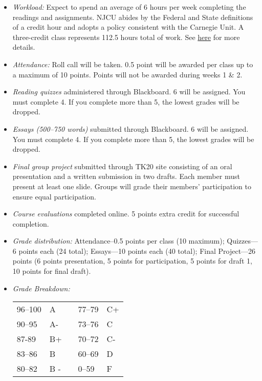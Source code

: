 \documentclass[article,oneside]{memoir}
\begin{document}
\begin{itemize}
\item \textit{Workload:} Expect to spend an average of 6 hours per week completing the readings and assignments. NJCU abides by the Federal and State definitions of a credit hour and adopts a policy consistent with the Carnegie Unit. A three-credit class represents 112.5 hours total of work. See \href{http://scoconno.github.io/Teaching/Credit.pdf}{here} for more details.

\item \textit{Attendance:} Roll call will be taken. 0.5 point will be awarded per class up to a maximum of 10 points. Points will not be awarded during weeks 1 \& 2. 

\item \textit{Reading quizzes} administered through Blackboard. 6 will be assigned. You must complete 4. If you complete more than 5, the lowest grades will be dropped. 


\item \textit{Essays (500--750 words)} submitted through Blackboard.  6 will be assigned. You must complete 4. If you complete more than 5, the lowest grades will be dropped. 

\item \textit{Final group project} submitted through TK20 site consisting of an oral presentation and a written submission in two drafts. Each member must present at least one slide. Groups will grade their members' participation to ensure equal participation. 

\item \textit{Course evaluations} completed online. 5 points extra credit for successful completion.
  
\item \textit{Grade distribution:} Attendance--0.5 points per class (10 maximum); Quizzes---6 points each (24 total);  Essays---10 points each (40 total); Final Project---26 points (6 points presentation, 5 points for participation, 5 points for draft 1, 10 points for final draft).


\item \textit{Grade Breakdown:}

 \begin{tabular}{ | l | l | p{2cm} | l | l | }
    \hline 
96--100 & A  & &  77--79 &  C+ \\  
90--95 & A- & &  73--76 & C \\
87-89 & B+ &  &  70--72 & C- \\ 
83--86 & B  & &  60--69 & D\\
80--82 & B - & & 0--59 & F\\ \hline
    \end{tabular}


\end{itemize}
\end{document}
